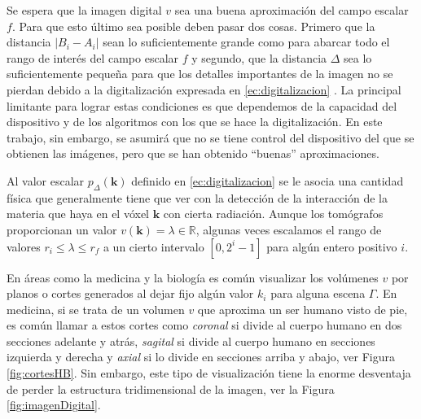 Se espera que la imagen digital $v$ sea una buena aproximación del campo escalar $f$. Para que esto último sea posible deben pasar dos cosas. Primero que la distancia $|B_i - A_i|$ sean lo suficientemente grande como para abarcar todo el rango de interés del campo escalar $f$ y segundo, que la distancia $\Delta$ sea lo suficientemente pequeña para que los detalles importantes de la imagen no se pierdan debido a la digitalización expresada en \eqref{ec:digitalizacion} \cite{edgarReconstruction}. La principal limitante para lograr estas condiciones es que dependemos de la capacidad del dispositivo y de los algoritmos con los que se hace la digitalización. En este trabajo, sin embargo, se asumirá que no se tiene control del dispositivo del que se obtienen las imágenes, pero que se han obtenido ``buenas'' aproximaciones.

Al valor escalar $p_{\Delta}(\textbf{k})$ definido en \eqref{ec:digitalizacion} se le asocia una cantidad física que generalmente tiene que ver con la detección de la interacción de la materia que haya en el vóxel $\textbf{k}$ con cierta radiación. Aunque los tomógrafos proporcionan un valor $v(\textbf{k}) = \lambda \in \mathbb{R}$, algunas veces escalamos el rango de valores $r_i \leq \lambda \leq r_f$ a un cierto intervalo $[0, 2^i - 1]$ para algún entero positivo $i$.

En áreas como la medicina y la biología es común visualizar los volúmenes $v$ por planos o cortes generados al dejar fijo algún valor $k_i$ para alguna escena $\Gamma$. En medicina, si se trata de un volumen $v$ que aproxima un ser humano visto de pie, es común llamar a estos cortes como \emph{coronal} si divide al cuerpo humano en dos secciones adelante y atrás, \emph{sagital} si divide al cuerpo humano en secciones izquierda y derecha y \emph{axial} si lo divide en secciones arriba y abajo, ver Figura \ref{fig:cortesHB}. Sin embargo, este tipo de visualización tiene la enorme desventaja de perder la estructura tridimensional de la imagen, ver la Figura \ref{fig:imagenDigital}.

